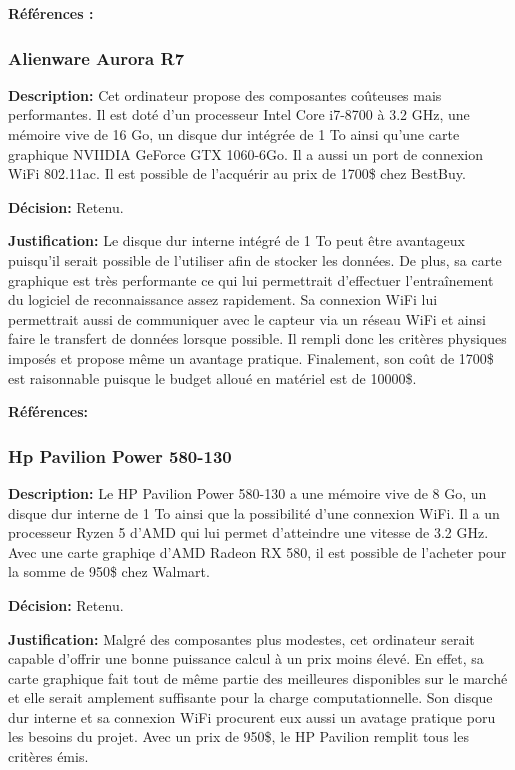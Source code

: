\textbf{Références :} \cite{Raspberry_Pi_Specs}
 
 
\subsubsection{Alienware Aurora R7}

\textbf{Description:} Cet ordinateur propose des composantes coûteuses mais performantes. Il est doté d'un processeur Intel Core i7-8700 à 3.2 GHz, une mémoire vive de 16 Go, un disque dur intégrée de 1 To ainsi qu'une carte graphique NVIIDIA GeForce GTX 1060-6Go. Il a aussi un port de connexion WiFi 802.11ac. Il est possible de l'acquérir au prix de 1700\$ chez BestBuy.

\textbf{Décision:} Retenu.

\textbf{Justification:} Le disque dur interne intégré de 1 To peut être avantageux puisqu'il serait possible de l'utiliser afin de stocker les données. De plus, sa carte graphique est très performante ce qui lui permettrait d'effectuer l'entraînement du logiciel de reconnaissance assez rapidement. Sa connexion WiFi lui permettrait aussi de communiquer avec le capteur via un réseau WiFi et ainsi faire le transfert de données lorsque possible. Il rempli donc les critères physiques imposés et propose même un avantage pratique. Finalement, son coût de 1700\$ est raisonnable puisque le budget alloué en matériel est de 10000\$.

\textbf{Références:} \cite{User_Benchmark_score} \cite{Alienware_R7} 


\subsubsection{Hp Pavilion Power 580-130}

\textbf{Description:} Le HP Pavilion Power 580-130 a une mémoire vive de 8 Go, un disque dur interne de 1 To ainsi que la possibilité d'une connexion WiFi. Il a un processeur Ryzen 5 d'AMD qui lui permet d'atteindre une vitesse de 3.2 GHz. Avec une carte graphiqe d'AMD Radeon RX 580, il est possible de l'acheter pour la somme de 950\$ chez Walmart.

\textbf{Décision:} Retenu.

\textbf{Justification:} Malgré des composantes plus modestes, cet ordinateur serait capable d'offrir une bonne puissance calcul à un prix moins élevé. En effet, sa carte graphique fait tout de même partie des meilleures disponibles sur le marché et elle serait amplement suffisante pour la charge computationnelle. Son disque dur interne et sa connexion WiFi procurent eux aussi un avatage pratique poru les besoins du projet. Avec un prix de 950\$, le HP Pavilion remplit tous les critères émis.

